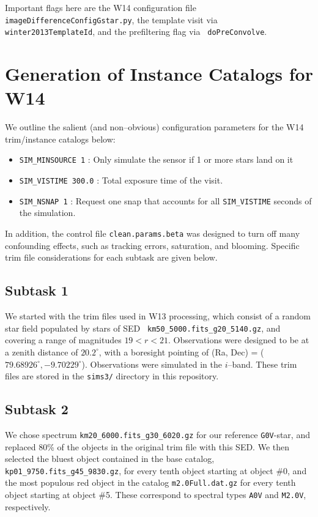 \documentclass[DM,toc]{lsstdoc}
\begin{document}
Important flags here are the W14 configuration file {\tt
  imageDifferenceConfigGstar.py}, the template visit via {\tt
  winter2013TemplateId}, and the prefiltering flag via {\tt
  doPreConvolve}.

\section{Generation of Instance Catalogs for W14 \label{appx:tasks}}

We outline the salient (and non--obvious) configuration parameters for
the W14 trim/instance catalogs below:
\begin{itemize}
  \item {\tt SIM\_MINSOURCE 1} : Only simulate the sensor if 1 or more
    stars land on it
  \item {\tt SIM\_VISTIME 300.0} : Total exposure time of the visit.
  \item {\tt SIM\_NSNAP 1} : Request one snap that accounts for all
    {\tt SIM\_VISTIME} seconds of the simulation.
\end{itemize}

In addition, the control file {\tt clean.params.beta} was designed to
turn off many confounding effects, such as tracking errors,
saturation, and blooming.  Specific trim file considerations for each
subtask are given below.

\subsection{Subtask 1}

We started with the trim files used in W13 processing, which consist
of a random star field populated by stars of SED {\tt
  km50\_5000.fits\_g20\_5140.gz}, and covering a range of magnitudes
$19 < r < 21$.  Observations were designed to be at a zenith distance
of $20.2^{\circ}$, with a boresight pointing of (Ra, Dec) =
($79.68926^{\circ}, -9.70229^{\circ}$).  Observations were simulated
in the $i$--band.  These trim files are stored in the {\tt sims3/}
directory in this repository.

\subsection{Subtask 2}

We chose spectrum {\tt km20\_6000.fits\_g30\_6020.gz} for our
reference {\tt G0V}-star, and replaced 80\% of the objects in the
original trim file with this SED.  We then selected the bluest object
contained in the base catalog, {\tt kp01\_9750.fits\_g45\_9830.gz},
for every tenth object starting at object \#0, and the most populous
red object in the catalog {\tt m2.0Full.dat.gz} for every tenth object
starting at object \#5.  These correspond to spectral types {\tt A0V}
and {\tt M2.0V}, respectively.
\end{document}
